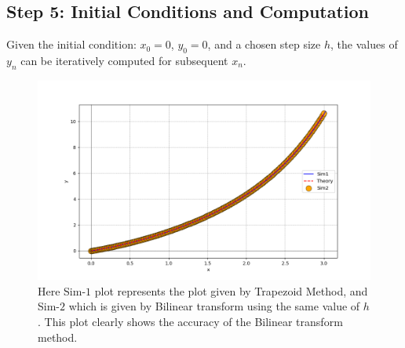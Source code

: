 \documentclass[journal]{IEEEtran}
\begin{document}
	\subsection*{Step 5: Initial Conditions and Computation}
	
	Given the initial condition:
	$x_0 = 0$, $y_0 = 0$,
	and a chosen step size $h$, the values of $y_n$ can be iteratively computed for subsequent $x_n$.\\
	\begin{figure}[h!]
		\centering
		\includegraphics[width=0.7\columnwidth]{figs/Fig1.png}
		\caption{Here Sim-$1$ plot represents the plot given by Trapezoid Method, and Sim-$2$ which is given by Bilinear transform using the same value of $h$. This plot clearly shows the accuracy of the Bilinear transform method.}
		\label{label}
	\end{figure}
\end{document}
